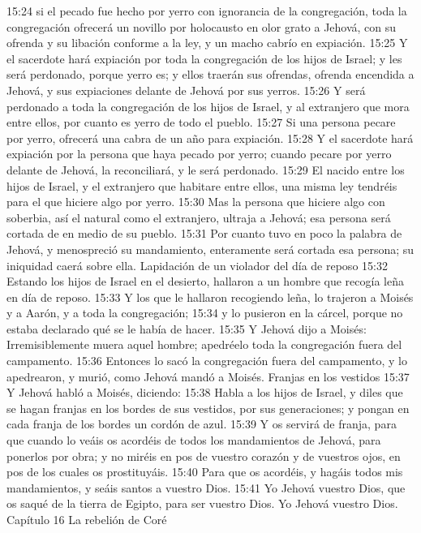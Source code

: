 15:24 si el pecado fue hecho por yerro con ignorancia de la congregación, toda la congregación ofrecerá un novillo por holocausto en olor grato a Jehová, con su ofrenda y su libación conforme a la ley, y un macho cabrío en expiación.  
15:25 Y el sacerdote hará expiación por toda la congregación de los hijos de Israel; y les será perdonado, porque yerro es; y ellos traerán sus ofrendas, ofrenda encendida a Jehová, y sus expiaciones delante de Jehová por sus yerros.  
15:26 Y será perdonado a toda la congregación de los hijos de Israel, y al extranjero que mora entre ellos, por cuanto es yerro de todo el pueblo.  
15:27 Si una persona pecare por yerro, ofrecerá una cabra de un año para expiación.  
15:28 Y el sacerdote hará expiación por la persona que haya pecado por yerro; cuando pecare por yerro delante de Jehová, la reconciliará, y le será perdonado.  
15:29 El nacido entre los hijos de Israel, y el extranjero que habitare entre ellos, una misma ley tendréis para el que hiciere algo por yerro.  
15:30 Mas la persona que hiciere algo con soberbia, así el natural como el extranjero, ultraja a Jehová; esa persona será cortada de en medio de su pueblo.  
15:31 Por cuanto tuvo en poco la palabra de Jehová, y menospreció su mandamiento, enteramente será cortada esa persona; su iniquidad caerá sobre ella.  
Lapidación de un violador del día de reposo  
15:32 Estando los hijos de Israel en el desierto, hallaron a un hombre que recogía leña en día de reposo.  
15:33 Y los que le hallaron recogiendo leña, lo trajeron a Moisés y a Aarón, y a toda la congregación;  
15:34 y lo pusieron en la cárcel, porque no estaba declarado qué se le había de hacer.  
15:35 Y Jehová dijo a Moisés: Irremisiblemente muera aquel hombre; apedréelo toda la congregación fuera del campamento.  
15:36 Entonces lo sacó la congregación fuera del campamento, y lo apedrearon, y murió, como Jehová mandó a Moisés.  
Franjas en los vestidos  
15:37 Y Jehová habló a Moisés, diciendo:  
15:38 Habla a los hijos de Israel, y diles que se hagan franjas en los bordes de sus vestidos, por sus generaciones; y pongan en cada franja de los bordes un cordón de azul.  
15:39 Y os servirá de franja, para que cuando lo veáis os acordéis de todos los mandamientos de Jehová, para ponerlos por obra; y no miréis en pos de vuestro corazón y de vuestros ojos, en pos de los cuales os prostituyáis.  
15:40 Para que os acordéis, y hagáis todos mis mandamientos, y seáis santos a vuestro Dios.  
15:41 Yo Jehová vuestro Dios, que os saqué de la tierra de Egipto, para ser vuestro Dios. Yo Jehová vuestro Dios.  
Capítulo 16 
La rebelión de Coré  

